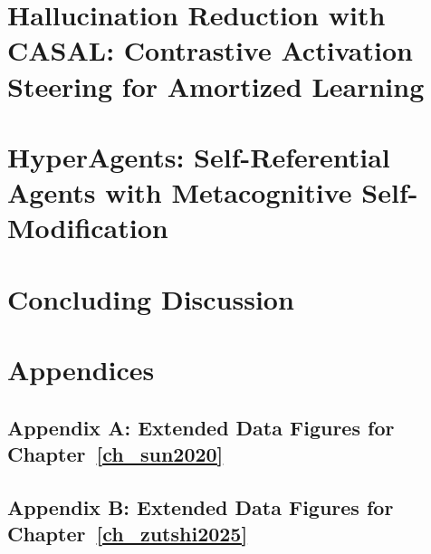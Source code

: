 \documentclass[12pt,oneside,letterpaper]{report}
\begin{document}
% 

\chapter{Hallucination Reduction with CASAL: Contrastive Activation Steering for Amortized Learning} \label{ch_casal}


\chapter{HyperAgents: Self-Referential Agents with Metacognitive Self-Modification} \label{ch_hyperagents}


\chapter{Concluding Discussion} \label{ch_conclusion}




\chapter{Appendices} %


\section*{Appendix A: Extended Data Figures for Chapter~\ref{ch_sun2020}}

\clearpage
{}

\section*{Appendix B: Extended Data Figures for Chapter~\ref{ch_zutshi2025}}

\clearpage
{}
\end{document}
